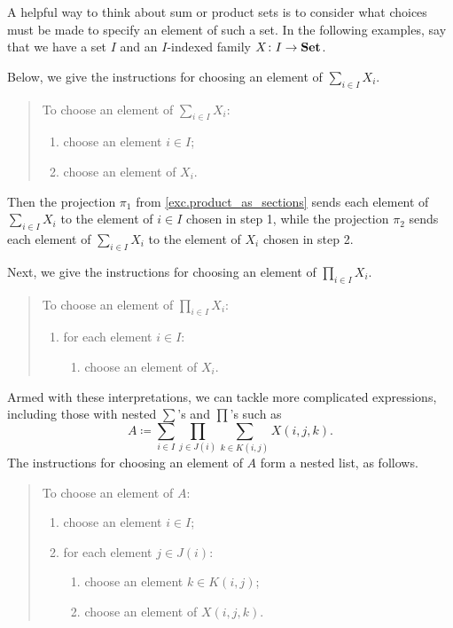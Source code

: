 \documentclass[Book-Poly]{subfiles}
\begin{document}
A helpful way to think about sum or product sets is to consider what choices must be made to specify an element of such a set.
In the following examples, say that we have a set $I$ and an $I$-indexed family $X \colon I \to \mathbf{Set}$.

Below, we give the instructions for choosing an element of $\sum_{i \in I} X_i$.

\begin{quote}
    To choose an element of $\sum_{i \in I} X_i$:
    \begin{enumerate}
        \item choose an element $i \in I$;
        \item choose an element of $X_i$.
    \end{enumerate}
\end{quote}


Then the projection $\pi_1$ from \cref{exc.product_as_sections} sends each element of $\sum_{i \in I} X_i$ to the element of $i \in I$ chosen in step 1, while the projection $\pi_2$ sends each element of $\sum_{i \in I} X_i$ to the element of $X_i$ chosen in step 2.

Next, we give the instructions for choosing an element of $\prod_{i \in I} X_i$.

\begin{quote}
    To choose an element of $\prod_{i \in I} X_i$:
    \begin{enumerate}
        \item for each element $i \in I$:
        \begin{enumerate}[label*=\arabic*.]
            \item choose an element of $X_i$.
        \end{enumerate}
    \end{enumerate}
\end{quote}


Armed with these interpretations, we can tackle more complicated expressions, including those with nested $\sum$'s and $\prod$'s such as
\begin{equation}\label{eqn.sum_prod_sum}
    A \coloneqq \sum_{i\in I}\prod_{j\in J(i)}\sum_{k\in K(i,j)}X(i,j,k).
\end{equation}
The instructions for choosing an element of $A$ form a nested list, as follows.

\begin{quote}
    To choose an element of $A$:
    \begin{enumerate}
        \item choose an element $i \in I$;
        \item for each element $j \in J(i)$:
        \begin{enumerate}[label*=\arabic*.]
            \item choose an element $k \in K(i,j)$;
            \item choose an element of $X(i,j,k)$.
        \end{enumerate}
    \end{enumerate}
\end{quote}
\end{document}
